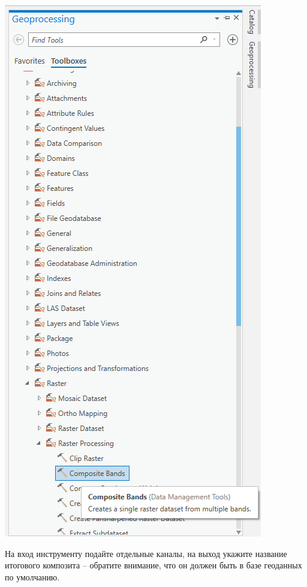 \documentclass[
  12pt,
]{book}
\begin{document}
\includegraphics{images/Ref01/Raster_tools.png}

На вход инструменту подайте отдельные каналы, на выход укажите название итогового композита -- обратите внимание, что он должен быть в базе геоданных по умолчанию.
\end{document}
